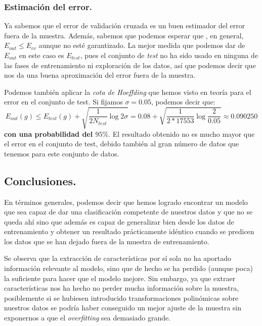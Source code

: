 \documentclass[a4paper, 20pt]{article}
\begin{document}
\subsubsection{Estimación del error.}

Ya sabemos que el error de validación cruzada es un buen estimador del error fuera de la muestra. Además, sabemos que podemos esperar que , en general, $E_{out} \leq E_{cv}$ aunque no esté garantizado. La mejor medida que podemos dar de $E_{out}$ en este caso es $E_{test}$, pues el conjunto de \emph{test} no ha sido usado en ninguna de las fases de entrenamiento ni exploración de los datos, así que podemos decir que nos da una buena aproximación del error fuera de la muestra.

Podemos también aplicar la \emph{cota de Hoeffding} que hemos visto en teoría para el error en el conjunto de test. Si fijamos $\sigma = 0.05$, podemos decir que:
\[
E_{out}(g) \leq E_{test}(g) + \sqrt{\frac{1}{2 N_{test}} \log{2}{\sigma}} = 0.08 + \sqrt{\frac{1}{2*17553} \log\frac{2}{0.05}} \approx 0.090250
\]
\textbf{con una probabilidad del $95\%$}. El resultado obtenido no es mucho mayor que el error en el conjunto de test, debido también al gran número de datos que tenemos para este conjunto de datos.

\subsection{Conclusiones.}

En términos generales, podemos decir que hemos logrado encontrar un modelo que sea capaz de dar una clasificación competente de nuestros datos y que no se queda ahí sino que además es capaz de generalizar bien desde los datos de entrenamiento y obtener un resultado prácticamente idéntico cuando se predicen los datos que se han dejado fuera de la muestra de entrenamiento.

Se observa que la extracción de características por sí sola no ha aportado información relevante al modelo, sino que de hecho se ha perdido (aunque poca) la suficiente para hacer que el modelo mejore. Sin embargo, ya que extraer características nos ha hecho no perder mucha información sobre la muestra, posiblemente si se hubiesen introducido transformaciones polinómicas sobre nuestros datos se podría haber conseguido un mejor ajuste de la muestra sin exponernos a que el \emph{overfitting} sea demasiado grande.

\newpage
\printbibliography

\newpage
\end{document}

